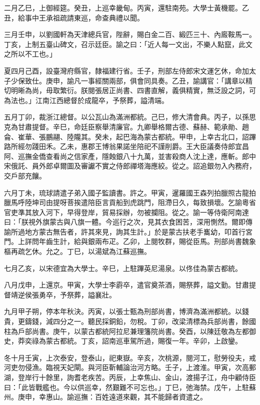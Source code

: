 \begin{pinyinscope}
二月乙巳，上御經筵。癸丑，上巡幸畿甸。丙寅，還駐南苑。大學士黃機罷。乙丑，給事中王承祖疏請東巡，命查典禮以聞。

三月壬申，以劉國軒為天津總兵官，陛辭，賜白金二百、緞匹三十、內廄鞍馬一。丁亥，上制五臺山碑文，召示廷臣。諭之曰：「近人每一文出，不樂人點竄，此文之所以不工也。」

夏四月己酉，設臺灣府縣官，隸福建行省。壬子，刑部左侍郎宋文運乞休，命加太子少保致仕。庚申，諭凡一事經關兩部，俱會同具奏。乙丑，諭講官：「講章以精切明晰為尚，毋取繁衍。朕閱張居正尚書、四書直解，義俱精實，無泛設之詞，可為法也。」江南江西總督於成龍卒，予祭葬，謚清端。

五月丁卯，裁浙江總督。以公瓦山為滿洲都統。己巳，修大清會典。丙子，以孫思克為甘肅提督。辛巳，命廷臣察舉清廉官。九卿舉格爾古德、蘇赫、範承勛、趙侖、崔華、張鵬翮、陸隴其。癸未，起巴海為蒙古都統。甲申，上幸古北口，詔蹕路所經勿踐田禾。乙未，惠郡王博翁果諾坐陪祀不謹削爵。王大臣議奏侍郎宜昌阿、巡撫金僑查看尚之信家產，隱蝕銀八十九萬，並害殺商人沈上達，應斬。郎中宋俄託、員外郎卓爾圖及審讞不實之侍郎禪塔海應絞。從之。詔追銀勿入內務府，交戶部充饟。

六月丁未，琉球請遣子弟入國子監讀書。許之。甲寅，暹羅國王森列拍臘照古龍拍臘馬呼陸坤司由提呀菩挨遣陪臣言貢船到虎跳門，阻滯日久，每致損壞。乞諭粵省官吏準其放入河下，早得登岸，貿易採辦，勿被攔阻。從之。諭一等侍衛阿南達曰：「朕視外旗蒙古與八旗一體。今巡行之次，見其衣食困苦，深用惻然。爾即傳諭所過地方蒙古無告者，許其來見，詢其生計。」於是蒙古扶老手巂幼，叩首行宮門。上詳問年齒生計，給與銀兩布疋。乙卯，上閱牧群，賜從臣馬。刑部尚書魏象樞再疏乞休。允之。丁巳，以湯斌為江蘇巡撫。

七月乙亥，以宋德宜為大學士。辛巳，上駐蹕英尼湯泉。以佟佳為蒙古都統。

八月戊申，上還京。甲寅，大學士李霨卒，遣官奠茶酒，賜祭葬，謚文勤。甘肅提督靖逆侯張勇卒，予祭葬，謚襄壯。

九月甲子朔，停本年秋決。丙寅，以張士甄為刑部尚書，博濟為滿洲都統。以錢貴，更鑄錢，減四分之一。聽民採銅鉛，勿稅。丁卯，改梁清標為兵部尚書，餘國柱為戶部尚書。庚午，以蒙古都統阿拉尼兼理籓院尚書。癸酉，以陳廷敬為左都御史，莽奕祿為蒙古都統。丁亥，詔南巡車駕所過，賜復一年。辛卯，上啟鑾。

冬十月壬寅，上次泰安，登泰山，祀東嶽。辛亥，次桃源，閱河工，慰勞役夫，戒河吏勿侵漁。臨視天妃閘。與河臣靳輔論治河方略。壬子，上渡淮。甲寅，次高郵湖，登岸行十餘里，詢耆老疾苦。丙辰，上幸焦山、金山，渡揚子江，舟中顧侍臣曰：「此皆戰艦也。今以供巡幸，然艱難不可忘也。」丁巳，弛海禁。戊午，上駐蘇州。庚申，幸惠山。諭巡撫：百姓遠道來觀，其不能歸者資遣之。


\end{pinyinscope}
